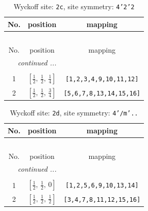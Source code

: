 \documentclass[fleqn,8pt]{jsarticle}
\begin{document}
\renewcommand{\arraystretch}{1.2}
\begin{longtable}{ccc}
\caption{Wyckoff site: {\tt 2c}, site symmetry: {\tt 4'2'2}}
 \\
 \hline \hline
No. & position & mapping \\ \hline \endfirsthead

\multicolumn{2}{l}{\tablename\ \thetable{}} \\
 \hline \hline
No. & position & mapping \\ \hline \endhead

 \hline \hline
\multicolumn{2}{r}{\footnotesize\it continued ...} \\ \endfoot

 \hline \hline
\multicolumn{2}{r}{} \\ \endlastfoot

1 & $\left[ \frac{1}{2},\, \frac{1}{2},\, \frac{1}{4} \right]$ & {\tt [1,2,3,4,9,10,11,12]} \\ \hline
2 & $\left[ \frac{1}{2},\, \frac{1}{2},\, \frac{3}{4} \right]$ & {\tt [5,6,7,8,13,14,15,16]} \\
\end{longtable}
\renewcommand{\arraystretch}{1.2}
\begin{longtable}{ccc}
\caption{Wyckoff site: {\tt 2d}, site symmetry: {\tt 4'/m'..}}
 \\
 \hline \hline
No. & position & mapping \\ \hline \endfirsthead

\multicolumn{2}{l}{\tablename\ \thetable{}} \\
 \hline \hline
No. & position & mapping \\ \hline \endhead

 \hline \hline
\multicolumn{2}{r}{\footnotesize\it continued ...} \\ \endfoot

 \hline \hline
\multicolumn{2}{r}{} \\ \endlastfoot

1 & $\left[ \frac{1}{2},\, \frac{1}{2},\, 0 \right]$ & {\tt [1,2,5,6,9,10,13,14]} \\ \hline
2 & $\left[ \frac{1}{2},\, \frac{1}{2},\, \frac{1}{2} \right]$ & {\tt [3,4,7,8,11,12,15,16]} \\
\end{longtable}
\renewcommand{\arraystretch}{1.2}
\end{document}

